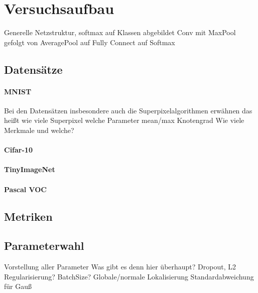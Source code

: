 \section{Versuchsaufbau}
\label{versuchsaufbau}

Generelle Netzstruktur, softmax auf Klassen abgebildet
Conv mit MaxPool gefolgt von AveragePool auf Fully Connect auf Softmax

\subsection{Datensätze}
\label{datensaetze}

\paragraph{MNIST}
\label{MNIST}

Bei den Datensätzen insbesondere auch die Superpixelalgorithmen erwähnen
das heißt wie viele Superpixel
welche Parameter
mean/max Knotengrad
Wie viele Merkmale und welche?

\cite{mnist}

\paragraph{Cifar-10}
\label{cifar_10}

\cite{cifar_10}

\paragraph{TinyImageNet}
\label{tiny_image_net}

\paragraph{Pascal VOC}
\label{pascal_voc}

\cite{pascal_voc}

\subsection{Metriken}
\label{metriken}

\subsection{Parameterwahl}
\label{parameterwahl}

Vorstellung aller Parameter
Was gibt es denn hier überhaupt?
Dropout, L2 Regularisierung?
BatchSize?
Globale/normale Lokalisierung
Standardabweichung für Gauß

